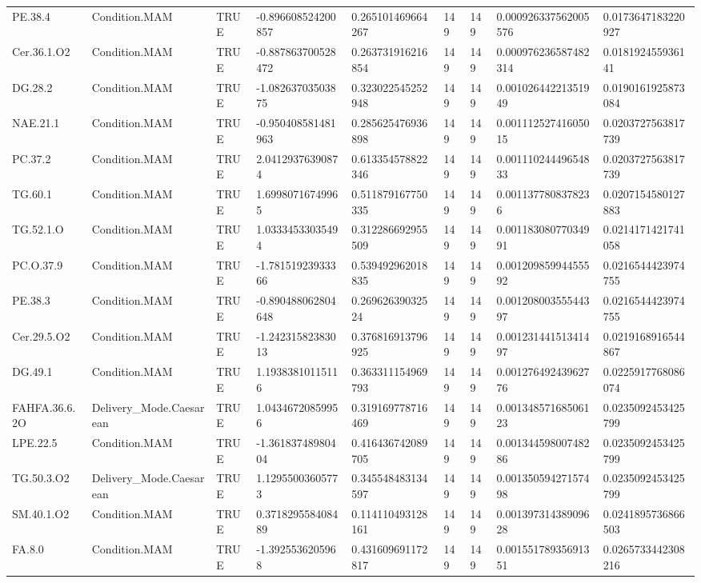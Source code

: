 \begin{longtable}{lllllllll}
PE.38.4 & Condition.MAM & TRUE & -0.896608524200857 & 0.265101469664267 & 149 & 149 & 0.000926337562005576 & 0.0173647183220927 \\
Cer.36.1.O2 & Condition.MAM & TRUE & -0.887863700528472 & 0.263731916216854 & 149 & 149 & 0.000976236587482314 & 0.018192455936141 \\
DG.28.2 & Condition.MAM & TRUE & -1.08263703503875 & 0.323022545252948 & 149 & 149 & 0.00102644221351949 & 0.0190161925873084 \\
NAE.21.1 & Condition.MAM & TRUE & -0.950408581481963 & 0.285625476936898 & 149 & 149 & 0.00111252741605015 & 0.0203727563817739 \\
PC.37.2 & Condition.MAM & TRUE & 2.04129376390874 & 0.613354578822346 & 149 & 149 & 0.00111024449654833 & 0.0203727563817739 \\
TG.60.1 & Condition.MAM & TRUE & 1.69980716749965 & 0.511879167750335 & 149 & 149 & 0.0011377808378236 & 0.0207154580127883 \\
TG.52.1.O & Condition.MAM & TRUE & 1.03334533035494 & 0.312286692955509 & 149 & 149 & 0.00118308077034991 & 0.0214171421741058 \\
PC.O.37.9 & Condition.MAM & TRUE & -1.78151923933366 & 0.539492962018835 & 149 & 149 & 0.00120985994455592 & 0.0216544423974755 \\
PE.38.3 & Condition.MAM & TRUE & -0.890488062804648 & 0.26962639032524 & 149 & 149 & 0.00120800355544397 & 0.0216544423974755 \\
Cer.29.5.O2 & Condition.MAM & TRUE & -1.24231582383013 & 0.376816913796925 & 149 & 149 & 0.00123144151341497 & 0.0219168916544867 \\
DG.49.1 & Condition.MAM & TRUE & 1.19383810115116 & 0.363311154969793 & 149 & 149 & 0.00127649243962776 & 0.0225917768086074 \\
FAHFA.36.6.2O & Delivery\_Mode.Caesarean & TRUE & 1.04346720859956 & 0.319169778716469 & 149 & 149 & 0.00134857168506123 & 0.0235092453425799 \\
LPE.22.5 & Condition.MAM & TRUE & -1.36183748980404 & 0.416436742089705 & 149 & 149 & 0.00134459800748286 & 0.0235092453425799 \\
TG.50.3.O2 & Delivery\_Mode.Caesarean & TRUE & 1.12955003605773 & 0.345548483134597 & 149 & 149 & 0.00135059427157498 & 0.0235092453425799 \\
SM.40.1.O2 & Condition.MAM & TRUE & 0.371829558408489 & 0.114110493128161 & 149 & 149 & 0.00139731438909628 & 0.0241895736866503 \\
FA.8.0 & Condition.MAM & TRUE & -1.3925536205968 & 0.431609691172817 & 149 & 149 & 0.00155178935691351 & 0.0265733442308216 \\

\end{longtable}
